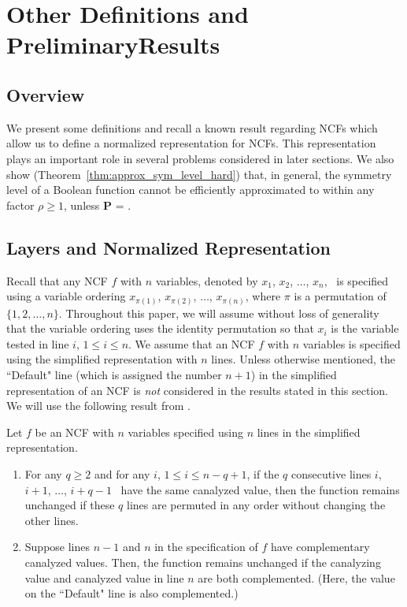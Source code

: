 \section{Other Definitions and Preliminary\newline Results}
\label{sec:prelim}

\subsection{Overview}

We present some definitions and recall
a known result regarding NCFs which allow us
to define a normalized representation for NCFs.
This representation plays an important role in several
problems considered in later sections.
We also show (Theorem~\ref{thm:approx_sym_level_hard}) 
that, in general, the symmetry level
of a Boolean function cannot be efficiently approximated to within any
factor $\rho \geq 1$, unless \textbf{P} = \cnp.

\medskip

\subsection{Layers and Normalized Representation}
\label{sse:ncf_layer}

Recall that any NCF $f$ with $n$ variables,
denoted by $x_1$, $x_2$, $\ldots$, $x_n$,~
is specified using a variable ordering 
$x_{\pi(1)}$, $x_{\pi(2)}$, $\ldots$,  $x_{\pi(n)}$,
where $\pi$ is a permutation of $\{1, 2, \ldots, n\}$.
Throughout this paper, we will assume without loss of generality
that the variable ordering uses the identity permutation 
so that $x_i$ is the variable tested in line $i$, $1 \leq i \leq n$. 
We assume that an NCF $f$ with $n$
variables is specified using the simplified representation with $n$ lines. 
Unless otherwise mentioned, the ``Default" line (which is assigned the number $n+1$)
in the simplified representation of an NCF is \emph{not} considered
in the results stated in this section.
We will use the following result from \cite{Stearns-etal-2018}.

\begin{observation} \label{obs:ncf_transformations}
Let $f$ be an NCF with $n$ variables specified using $n$ lines
in the simplified representation. 
\begin{enumerate}
\item 
For any $q \geq 2$ and for any $i$, $1 \leq i \leq n-q+1$,
if the $q$ consecutive lines $i$, $i+1$, $\ldots$, $i+q-1$~
have the same canalyzed value, then the function remains
unchanged if these $q$ lines are permuted in any order
without changing the other lines.

\item 
Suppose lines $n-1$ and $n$ in the specification of $f$ 
have complementary canalyzed values.
Then, the function remains unchanged 
if the canalyzing value and canalyzed value in line $n$
are both complemented. 
(Here, the value on the ``Default" line is also complemented.)
\QED
\end{enumerate}
\end{observation}

